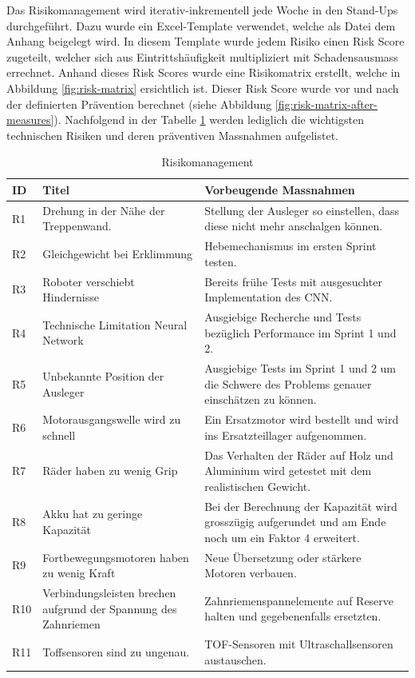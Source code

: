 Das Risikomanagement wird iterativ-inkrementell jede Woche in den Stand-Ups durchgeführt. Dazu wurde ein Excel-Template verwendet, welche als Datei dem Anhang beigelegt wird. In diesem Template wurde jedem Risiko einen Risk Score zugeteilt, welcher sich aus Eintrittshäufigkeit multipliziert mit Schadensausmass errechnet. Anhand dieses Risk Scores wurde eine Risikomatrix erstellt, welche in Abbildung \ref{fig:risk-matrix} ersichtlich ist. Dieser Risk Score wurde vor und nach der definierten Prävention berechnet (siehe Abbildung \ref{fig:risk-matrix-after-measures}). Nachfolgend in der Tabelle \ref{tab:risikomanagement} werden lediglich die wichtigsten technischen Risiken und deren präventiven Massnahmen aufgelistet. 

\begin{center}
\begin{table}[H]
    \begin{tabularx}{\textwidth}{|l|X|X|}
        \hline
        \textbf{ID} & \textbf{Titel} & \textbf{Vorbeugende Massnahmen} \\ \hline
        R1 & Drehung in der Nähe der Treppenwand. & Stellung der Ausleger so einstellen, dass diese nicht mehr anschalgen können. \\ \hline
        R2 & Gleichgewicht bei Erklimmung & Hebemechanismus im ersten Sprint testen. \\ \hline
        R3 & Roboter verschiebt Hindernisse & Bereits frühe Tests mit ausgesuchter Implementation des CNN. \\ \hline 
        R4 & Technische Limitation Neural Network & Ausgiebige Recherche und Tests bezüglich Performance im Sprint 1 und 2.\\ \hline
        R5 & Unbekannte Position der Ausleger & Ausgiebige Tests im Sprint 1 und 2 um die Schwere des Problems genauer einschätzen zu können. \\ \hline
          R6 & Motorausgangswelle wird zu schnell  & Ein Ersatzmotor wird bestellt und wird ins Ersatzteillager aufgenommen. \\ \hline
            R7 & Räder haben zu wenig Grip & Das Verhalten der Räder auf Holz und Aluminium wird getestet mit dem realistischen Gewicht. \\ \hline
              R8 & Akku hat zu geringe Kapazität & Bei der Berechnung der Kapazität wird grosszügig aufgerundet und am Ende noch um ein Faktor 4 erweitert. \\ \hline
                R9 & Fortbewegungsmotoren haben zu wenig Kraft & Neue Übersetzung oder stärkere Motoren verbauen. \\ \hline
                  R10 & Verbindungsleisten brechen aufgrund der Spannung des Zahnriemen & Zahnriemenspannelemente auf Reserve halten und gegebenenfalls ersetzten. \\ \hline
                   R11 & Toffsensoren sind zu ungenau. & TOF-Sensoren mit Ultraschallsensoren austauschen. \\ \hline
    \end{tabularx}
    \caption{Risikomanagement}
    \label{tab:risikomanagement}
\end{table}
\end{center}

